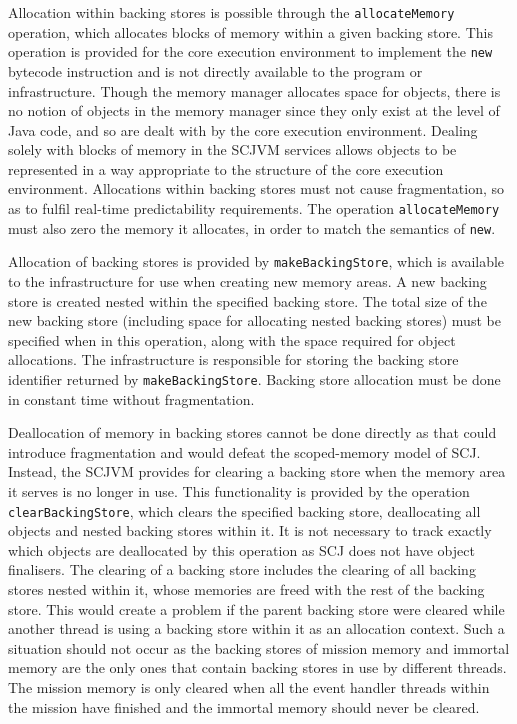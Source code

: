 Allocation within backing stores is possible through the
\texttt{allocate\-Memory} operation, which allocates blocks of memory
within a given backing store.
This operation is provided for the core execution environment to
implement the \texttt{new} bytecode instruction and is not directly
available to the program or infrastructure.
Though the memory manager allocates space for objects, there is no
notion of objects in the memory manager since they only exist at the
level of Java code, and so are dealt with by the core execution
environment. 
Dealing solely with blocks of memory in the SCJVM services allows
objects to be represented in a way appropriate to the structure of the
core execution environment.
Allocations within backing stores must not cause fragmentation, so as
to fulfil real-time predictability requirements.
The operation \texttt{allocate\-Memory} must also zero the memory it
allocates, in order to match the semantics of \texttt{new}.
 
Allocation of backing stores is provided by
\texttt{make\-Backing\-Store}, which is available to the
infrastructure for use when creating new memory areas.
A new backing store is created nested within the specified backing
store.
The total size of the new backing store (including space for
allocating nested backing stores) must be specified when in this
operation, along with the space required for object allocations.
The infrastructure is responsible for storing the backing store
identifier returned by \texttt{make\-Backing\-Store}.
Backing store allocation must be done in constant time without
fragmentation.

Deallocation of memory in backing stores cannot be done directly as
that could introduce fragmentation and would defeat the scoped-memory
model of SCJ.
Instead, the SCJVM provides for clearing a backing store when the
memory area it serves is no longer in use.
This functionality is provided by the operation
\texttt{clear\-Backing\-Store}, which clears the specified backing
store, deallocating all objects and nested backing stores within it.
It is not necessary to track exactly which objects are deallocated by
this operation as SCJ does not have object finalisers.
The clearing of a backing store includes the clearing of all backing
stores nested within it, whose memories are freed with the rest of the
backing store.
This would create a problem if the parent backing store were cleared
while another thread is using a backing store within it as an
allocation context.
Such a situation should not occur as the backing stores of mission
memory and immortal memory are the only ones that contain backing
stores in use by different threads.
The mission memory is only cleared when all the event handler threads
within the mission have finished and the immortal memory should never
be cleared.

